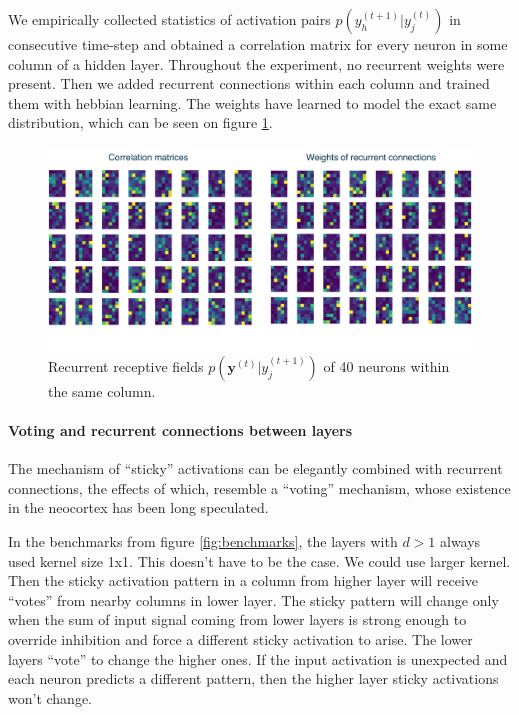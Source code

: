 \documentclass[12pt]{article}
\begin{document}
We empirically collected statistics of activation pairs $p(y_h^{(t+1)}|y_j^{(t)})$ in consecutive time-step and obtained a correlation matrix for every neuron in some column of a hidden layer. Throughout the experiment, no recurrent weights were present. Then we added recurrent connections within each column and trained them with hebbian learning. The weights have learned to model the exact same distribution, which can be seen on figure \ref{fig:recurrent_connections}.

\begin{figure}[!htbp]
	\centering
	\includegraphics[width=13.8cm]{recurrent_connections}
	\caption{Recurrent receptive fields $p(\boldsymbol{y}^{(t)}|y_j^{(t+1)})$ of 40 neurons within the same column. }
	\label{fig:recurrent_connections}
\end{figure} 
 
 \paragraph{Voting and recurrent connections between layers}
 
 The mechanism of ``sticky'' activations can be elegantly combined with recurrent connections, the effects of which, resemble a ``voting'' mechanism, whose existence in the neocortex has been long speculated.
 
In the benchmarks from figure \ref{fig:benchmarks}, the layers with $d>1$ always used kernel size 1x1. This doesn't have to be the case. We could use larger kernel.  Then the sticky activation pattern in a column from higher layer will receive ``votes'' from nearby columns in lower layer. The sticky pattern will change only when the sum of input signal coming from lower layers is strong enough to override inhibition and force a different sticky activation to arise. The lower layers ``vote'' to change the higher ones. If the input activation is unexpected and each neuron predicts a different pattern, then the higher layer sticky activations won't change. 
\end{document}
